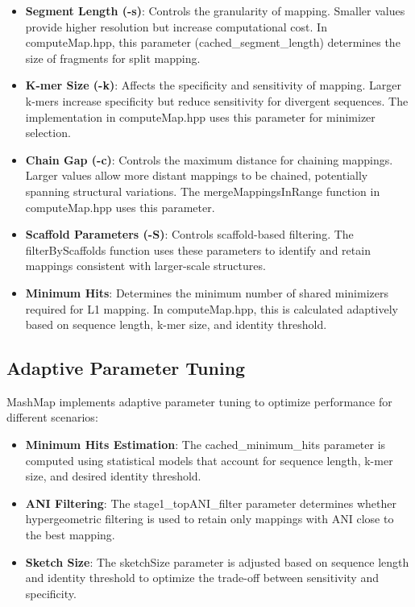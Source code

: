 \documentclass{article}
\begin{document}
\begin{itemize}
    \item \textbf{Segment Length (-s)}: Controls the granularity of mapping. Smaller values provide higher resolution but increase computational cost. In computeMap.hpp, this parameter (cached\_segment\_length) determines the size of fragments for split mapping.
    
    \item \textbf{K-mer Size (-k)}: Affects the specificity and sensitivity of mapping. Larger k-mers increase specificity but reduce sensitivity for divergent sequences. The implementation in computeMap.hpp uses this parameter for minimizer selection.
    
    \item \textbf{Chain Gap (-c)}: Controls the maximum distance for chaining mappings. Larger values allow more distant mappings to be chained, potentially spanning structural variations. The mergeMappingsInRange function in computeMap.hpp uses this parameter.
    
    \item \textbf{Scaffold Parameters (-S)}: Controls scaffold-based filtering. The filterByScaffolds function uses these parameters to identify and retain mappings consistent with larger-scale structures.
    
    \item \textbf{Minimum Hits}: Determines the minimum number of shared minimizers required for L1 mapping. In computeMap.hpp, this is calculated adaptively based on sequence length, k-mer size, and identity threshold.
\end{itemize}

\subsection{Adaptive Parameter Tuning}

MashMap implements adaptive parameter tuning to optimize performance for different scenarios:

\begin{itemize}
    \item \textbf{Minimum Hits Estimation}: The cached\_minimum\_hits parameter is computed using statistical models that account for sequence length, k-mer size, and desired identity threshold.
    
    \item \textbf{ANI Filtering}: The stage1\_topANI\_filter parameter determines whether hypergeometric filtering is used to retain only mappings with ANI close to the best mapping.
    
    \item \textbf{Sketch Size}: The sketchSize parameter is adjusted based on sequence length and identity threshold to optimize the trade-off between sensitivity and specificity.
\end{itemize}
\end{document}
